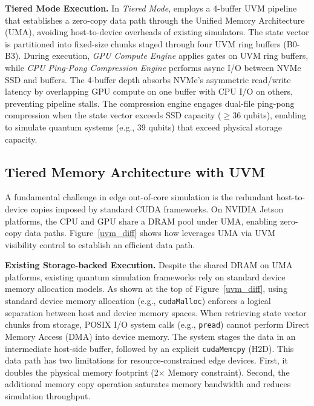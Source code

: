 \noindent\textbf{Tiered Mode Execution.}
In \textit{Tiered Mode}, \EdgeQuantum employs a 4-buffer UVM pipeline that establishes a zero-copy data path through the Unified Memory Architecture (UMA), avoiding host-to-device overheads of existing simulators. The state vector is partitioned into fixed-size chunks staged through four UVM ring buffers (B0-B3). During execution, \textit{GPU Compute Engine} applies gates on UVM ring buffers, while \textit{CPU Ping-Pong Compression Engine} performs async I/O between NVMe SSD and buffers. The 4-buffer depth absorbs NVMe's asymmetric read/write latency by overlapping GPU compute on one buffer with CPU I/O on others, preventing pipeline stalls. The compression engine engages dual-file ping-pong compression when the state vector exceeds SSD capacity ($\geq$36 qubits), enabling \EdgeQuantum to simulate quantum systems (e.g., 39 qubits) that exceed physical storage capacity.



\subsection{Tiered Memory Architecture with UVM}
\label{design_memory}



A fundamental challenge in edge out-of-core simulation is the redundant host-to-device copies imposed by standard CUDA frameworks. On NVIDIA Jetson platforms, the CPU and GPU share a DRAM pool under UMA, enabling zero-copy data paths. Figure~\ref{uvm_diff} shows how \EdgeQuantum leverages UMA via UVM visibility control to establish an efficient data path.

\noindent\textbf{Existing Storage-backed Execution. }Despite the shared DRAM on UMA platforms, existing quantum simulation frameworks rely on standard device memory allocation models. As shown at the top of Figure~\ref{uvm_diff}, using standard device memory allocation (e.g., \texttt{cudaMalloc}) enforces a logical separation between host and device memory spaces. When retrieving state vector chunks from storage, POSIX I/O system calls (e.g., \texttt{pread}) cannot perform Direct Memory Access (DMA) into device memory. The system stages the data in an intermediate host-side buffer, followed by an explicit \texttt{cudaMemcpy} (H2D). This data path has two limitations for resource-constrained edge devices. First, it doubles the physical memory footprint (2$\times$ Memory constraint). Second, the additional memory copy operation saturates memory bandwidth and reduces simulation throughput.


